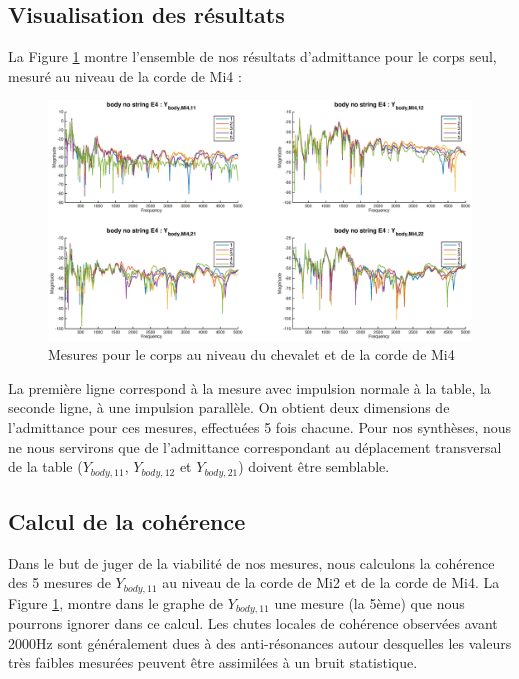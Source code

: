 \subsection{Visualisation des résultats}
La Figure \ref{fig:goll} montre l'ensemble de nos résultats d'admittance pour le corps seul, mesuré au niveau de la corde de Mi4 : 
\begin{figure}[h]
\centering
\includegraphics[width = 14cm]{figures/Y_body_E4.eps}
\caption{Mesures pour le corps au niveau du chevalet et de la corde de Mi4}
\label{fig:goll}
\end{figure}
La première ligne correspond à la mesure avec impulsion normale à la table, la seconde ligne, à une impulsion parallèle. On obtient deux dimensions de l'admittance pour ces mesures, effectuées 5 fois chacune. Pour nos synthèses, nous ne nous servirons que de l'admittance correspondant au déplacement transversal de la table ($Y_{body,11}$, $Y_{body,12}$ et $Y_{body,21}$) doivent être semblable.

\subsection{Calcul de la cohérence}
Dans le but de juger de la viabilité de nos mesures, nous calculons la cohérence des 5 mesures de $Y_{body,11}$ au niveau de la corde de Mi2 et de la corde de Mi4. La Figure \ref{fig:goll},  montre dans le graphe de $Y_{body,11}$ une mesure (la 5ème) que nous pourrons ignorer dans ce calcul. Les chutes locales de cohérence observées avant 2000Hz sont généralement dues à des anti-résonances autour desquelles les valeurs très faibles mesurées peuvent être assimilées à un bruit statistique.


